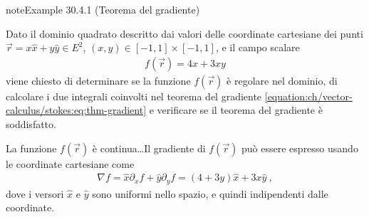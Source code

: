 \documentclass[letterpaper,10pt,italian]{jupyterBook}
\begin{document}
\begin{sphinxadmonition}{note}{Example 30.4.1 (Teorema del gradiente)}



\sphinxAtStartPar
Dato il dominio quadrato descritto dai valori delle coordinate cartesiane dei punti \(\vec{r} = x \hat{x} + y \hat{y} \in E^2\), \((x, y) \in [-1, 1] \times [-1,1]\), e il campo scalare
\begin{equation*}
\begin{split}f(\vec{r}) = 4 x + 3 x y\end{split}
\end{equation*}
\sphinxAtStartPar
viene chiesto di determinare se la funzione \(f(\vec{r})\) è regolare nel dominio, di calcolare i due integrali coinvolti nel teorema del gradiente \eqref{equation:ch/vector-calculus/stokes:eq:thm-gradient} e verificare se il teorema del gradiente è soddisfatto.

\sphinxAtStartPar
La funzione \(f(\vec{r})\) è continua…Il gradiente di \(f(\vec{r})\) può essere espresso usando le coordinate cartesiane come
\begin{equation*}
\begin{split}\nabla f = \hat{x} \partial_x f + \hat{y} \partial_y f = (4 + 3 y) \hat{x} + 3 x \hat{y} \ ,\end{split}
\end{equation*}
\sphinxAtStartPar
dove i versori \(\hat{x}\) e \(\hat{y}\) sono uniformi nello spazio, e quindi indipendenti dalle coordinate.


\end{sphinxadmonition}
\end{document}
